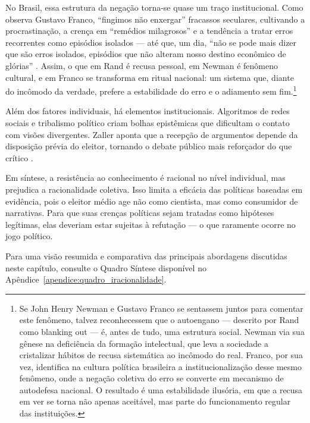 No Brasil, essa estrutura da negação torna-se quase um traço institucional. Como observa Gustavo Franco, “fingimos não enxergar” fracassos seculares, cultivando a procrastinação, a crença em “remédios milagrosos” e a tendência a tratar erros recorrentes como episódios isolados — até que, um dia, “não se pode mais dizer que são erros isolados, episódios que não alteram nosso destino econômico de glórias” \cite[p.~38-39]{franco2021licoes}. Assim, o que em Rand é recusa pessoal, em Newman é fenômeno cultural, e em Franco se transforma em ritual nacional: um sistema que, diante do incômodo da verdade, prefere a estabilidade do erro e o adiamento sem fim.\footnote{Se John Henry Newman e Gustavo Franco se sentassem juntos para comentar este fenômeno, talvez reconhecessem que o autoengano — descrito por Rand como blanking out — é, antes de tudo, uma estrutura social. Newman via sua gênese na deficiência da formação intelectual, que leva a sociedade a cristalizar hábitos de recusa sistemática ao incômodo do real. Franco, por sua vez, identifica na cultura política brasileira a institucionalização desse mesmo fenômeno, onde a negação coletiva do erro se converte em mecanismo de autodefesa nacional. O resultado é uma estabilidade ilusória, em que a recusa em ver se torna não apenas aceitável, mas parte do funcionamento regular das instituições.}

Além dos fatores individuais, há elementos institucionais. Algoritmos de redes sociais e tribalismo político criam bolhas epistêmicas que dificultam o contato com visões divergentes. Zaller aponta que a recepção de argumentos depende da disposição prévia do eleitor, tornando o debate público mais reforçador do que crítico \cite{zaller1992nature}.

Em síntese, a resistência ao conhecimento é racional no nível individual, mas prejudica a racionalidade coletiva. Isso limita a eficácia das políticas baseadas em evidência, pois o eleitor médio age não como cientista, mas como consumidor de narrativas. Para que suas crenças políticas sejam tratadas como hipóteses legítimas, elas deveriam estar sujeitas à refutação — o que raramente ocorre no jogo político.


Para uma visão resumida e comparativa das principais abordagens discutidas neste capítulo, consulte o Quadro Síntese disponível no Apêndice~\ref{apendice:quadro_iracionalidade}.

